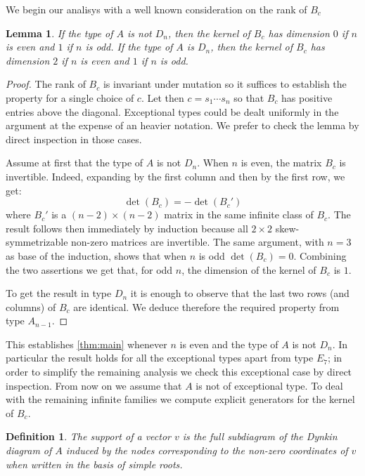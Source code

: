 \documentclass[11pt]{amsart}
\newtheorem{definition}[theorem]{Definition}
\newtheorem{lemma}[theorem]{Lemma}
\numberwithin{equation}{section}
\begin{document}
  We begin our analisys with a well known consideration on the rank of $B_c$ 
  \begin{lemma}
    \label{lem:dimensions}
    If the type of $A$ is not $D_n$, then the kernel of $B_c$ has dimension $0$ if $n$ is even and $1$ if $n$ is odd.
    If the type of $A$ is $D_n$, then the kernel of $B_c$ has dimension $2$ if $n$ is even and $1$ if $n$ is odd.
  \end{lemma}
  \begin{proof}
    The rank of $B_c$ is invariant under mutation so it suffices to establish the property for a single choice of $c$. 
    Let then $c=s_1\cdots s_n$ so that $B_c$ has positive entries above the diagonal.
    Exceptional types could be dealt uniformly in the argument at the expense of an heavier notation. 
    We prefer to check the lemma by direct inspection in those cases.

    Assume at first that the type of $A$ is not $D_n$.
    When $n$ is even, the matrix $B_c$ is invertible. 
    Indeed, expanding by the first column and then by the first row, we get:
    \[
      \det(B_c)=-\det(B_c')
    \]
    where $B_c'$ is a $(n-2)\times(n-2)$ matrix in the same infinite class of $B_c$. 
    The result follows then immediately by induction because all $2\times2$ skew-symmetrizable non-zero matrices are invertible.
    The same argument, with $n=3$ as base of the induction, shows that when $n$ is odd $\det(B_c)=0$.
    Combining the two assertions we get that, for odd $n$, the dimension of the kernel of $B_c$ is $1$.

    To get the result in type $D_n$ it is enough to observe that the last two rows (and columns) of $B_c$ are identical. 
    We deduce therefore the required property from type $A_{n-1}$.
  \end{proof}

  This establishes \cref{thm:main} whenever $n$ is even and the type of $A$ is not $D_n$.
  In particular the result holds for all the exceptional types apart from type $E_7$; in order to simplify the remaining analysis we check this exceptional case by direct inspection.
  From now on we assume that $A$ is not of exceptional type.
  To deal with the remaining infinite families we compute explicit generators for the kernel of $B_c$. 
  
  \begin{definition}
    The \emph{support} of a vector $v$ is the full subdiagram of the Dynkin diagram of $A$ induced by the nodes corresponding to the non-zero coordinates of $v$ when written in the basis of simple roots.
  \end{definition}
\end{document}
